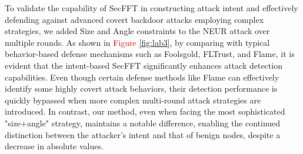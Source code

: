 \documentclass[lettersize,journal]{IEEEtran}
\begin{document}
\begin{figure*}[!t]
    \caption{\textcolor{red}{The figure illustrates the defense performance of four methods—Foolsgold \cite{foolsgold}, FLTrust \cite{FLTrust}, Flame \cite{FLAME}, and SecFFT—against three attack types: EdgeCase \cite{EDGE_CASE}, size-constrained EdgeCase, and EdgeCase constrained by both size and angle. Each experiment involves 50 nodes, with nodes 0-19 being malicious. The first to third rows represent EdgeCase attacks, size-constrained EdgeCase attacks, and EdgeCase attacks constrained by both size and angle, respectively. The columns show results based on cosine similarity (Foolsgold algorithm 1 line 7), aggregation weights (FLTrust algorithm 2 line 15), HDBSCAN probability scores (Flame Chapter 2.4), and intent-point similarity (SecFFT).}}
    \label{fig:lab3}
\end{figure*}

To validate the capability of SecFFT in constructing attack intent and effectively defending against advanced covert backdoor attacks employing complex strategies, we added Size and Angle constraints to the NEUR attack over multiple rounds. As shown in \textcolor{red}{Figure \ref{fig:lab3}}, by comparing with typical behavior-based defense mechanisms such as Foolsgold, FLTrust, and Flame, it is evident that the intent-based SecFFT significantly enhances attack detection capabilities. Even though certain defense methods like Flame can effectively identify some highly covert attack behaviors, their detection performance is quickly bypassed when more complex multi-round attack strategies are introduced. In contrast, our method, even when facing the most sophisticated "size+angle" strategy, maintains a notable difference, enabling the continued distinction between the attacker's intent and that of benign nodes, despite a decrease in absolute values.
\end{document}
